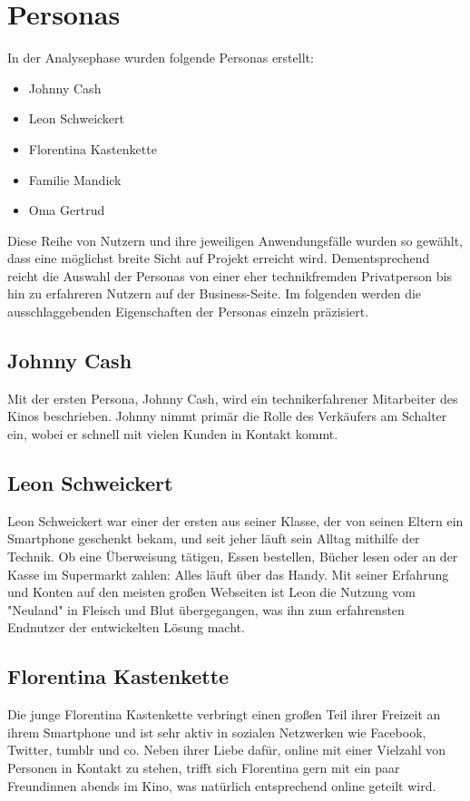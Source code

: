 \section{Personas}

In der Analysephase wurden folgende Personas erstellt:
\begin{itemize}
\item Johnny Cash
\item Leon Schweickert
\item Florentina Kastenkette
\item Familie Mandick
\item Oma Gertrud
\end{itemize}

Diese Reihe von Nutzern und ihre jeweiligen Anwendungsfälle wurden so gewählt, dass eine möglichst breite Sicht auf Projekt erreicht wird.
Dementsprechend reicht die Auswahl der Personas von einer eher technikfremden Privatperson bis hin zu erfahreren Nutzern auf der Business-Seite.
Im folgenden werden die ausschlaggebenden Eigenschaften der Personas einzeln präzisiert.


\subsection{Johnny Cash}
Mit der ersten Persona, Johnny Cash, wird ein technikerfahrener Mitarbeiter des Kinos beschrieben. Johnny nimmt primär die Rolle des Verkäufers am Schalter ein, wobei er schnell mit vielen Kunden in Kontakt kommt. 

\subsection{Leon Schweickert}
Leon Schweickert war einer der ersten aus seiner Klasse, der von seinen Eltern ein Smartphone geschenkt bekam, und seit jeher läuft sein Alltag mithilfe der Technik. Ob eine Überweisung tätigen, Essen bestellen, Bücher lesen oder an der Kasse im Supermarkt zahlen: Alles läuft über das Handy. Mit seiner Erfahrung und Konten auf den meisten großen Webseiten ist Leon die Nutzung vom "Neuland" in Fleisch und Blut übergegangen, was ihn zum erfahrensten Endnutzer der entwickelten Lösung macht.

\subsection{Florentina Kastenkette}
Die junge Florentina Kastenkette verbringt einen großen Teil ihrer Freizeit an ihrem Smartphone und ist sehr aktiv in sozialen Netzwerken wie Facebook, Twitter, tumblr und co. Neben ihrer Liebe dafür, online mit einer Vielzahl von Personen in Kontakt zu stehen, trifft sich Florentina gern mit ein paar Freundinnen abends im Kino, was natürlich entsprechend online geteilt wird.

